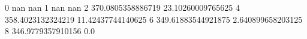 0 nan nan
1 nan nan
2 370.0805358886719 23.10260009765625
4 358.4023132324219 11.42437744140625
6 349.61883544921875 2.640899658203125
8 346.9779357910156 0.0
